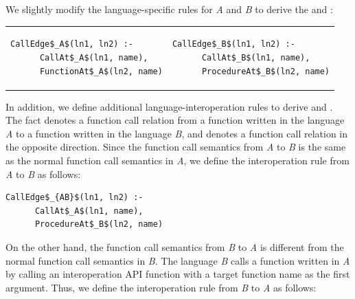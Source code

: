 
\noindent 
We slightly modify the language-specific rules for {\it A} and {\it B} to
derive the  and :

\begin{tabular}{ll}
  {\begin{lstlisting}[style=mrule]
    CallEdge$_A$(ln1, ln2) :-
      CallAt$_A$(ln1, name),
      FunctionAt$_A$(ln2, name)
  \end{lstlisting}} & 
  {\begin{lstlisting}[style=mrule]
    CallEdge$_B$(ln1, ln2) :-
      CallAt$_B$(ln1, name),
      ProcedureAt$_B$(ln2, name)
  \end{lstlisting}}
\end{tabular}

\noindent
In addition, we define additional language-interoperation rules to derive  and . The fact  denotes a function call relation from a function written in
the language {\it A} to a function written in the language {\it B}, and  denotes a function call relation in the opposite direction.
Since the function call semantics from {\it A} to {\it B} is the same as the
normal function call semantics in {\it A}, we define the interoperation rule from {\it
A} to {\it B} as follows: 


\begin{lstlisting}[style=mrule]
    CallEdge$_{AB}$(ln1, ln2) :-
      CallAt$_A$(ln1, name),
      ProcedureAt$_B$(ln2, name)
\end{lstlisting}

\noindent
On the other hand, the function call semantics from {\it B} to {\it A} is
different from the normal function call semantics in {\it B}. The language {\it B} calls
a function written in {\it A} by calling an interoperation API function  with a target function name as the first argument. Thus, we define
the interoperation rule from {\it B} to {\it A} as follows: 

